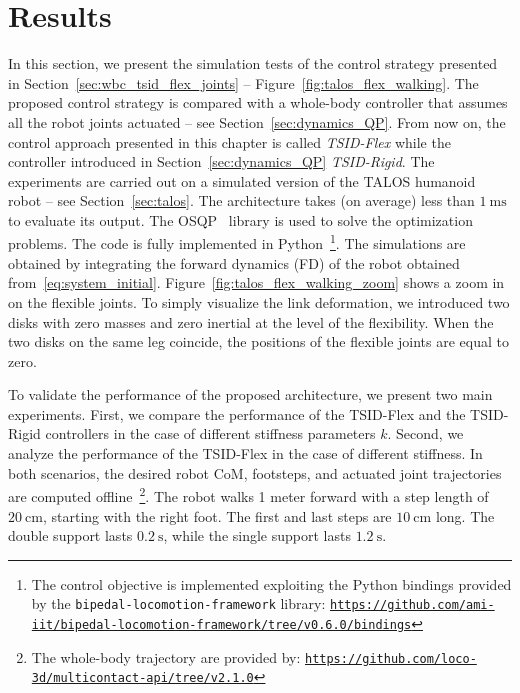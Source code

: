 \section{Results\label{sec:flexible_joint_result}}
In this section, we present the simulation tests of the control strategy presented in
Section~\ref{sec:wbc_tsid_flex_joints} -- Figure~\ref{fig:talos_flex_walking}.
The proposed control strategy is compared with a whole-body controller that assumes all the robot joints actuated --  see Section~\ref{sec:dynamics_QP}. From now on, the control approach presented in this chapter is called \emph{TSID-Flex} while the controller introduced in Section~\ref{sec:dynamics_QP} \emph{TSID-Rigid}.
The experiments are carried out on a simulated version of the TALOS humanoid robot -- see Section~\ref{sec:talos}. The architecture takes (on average) less than $\SI{1}{\milli \second}$ to evaluate its output. The OSQP~\citep{Stellato2018} library is used to solve the optimization problems. The code is fully implemented in Python~\footnote{The control objective is implemented exploiting the Python bindings provided by the \texttt{bipedal-locomotion-framework} library: \href{https://github.com/ami-iit/bipedal-locomotion-framework/tree/v0.6.0/bindings}{\texttt{https://github.com/ami-iit/bipedal-locomotion-framework/tree/v0.6.0/bindings}}}.
The simulations are obtained by integrating the forward dynamics (FD) of the robot obtained from~\eqref{eq:system_initial}. Figure~\ref{fig:talos_flex_walking_zoom} shows a zoom in on the flexible joints. To simply visualize the link deformation, we introduced two disks with zero masses and zero inertial at the level of the flexibility. When the two disks on the same leg coincide, the positions of the flexible joints are equal to zero.
\par
To validate the performance of the proposed architecture, we present two main experiments.
First, we compare the performance of the TSID-Flex and the TSID-Rigid controllers in the case of different stiffness parameters $k$. Second, we analyze the performance of the TSID-Flex in the case of different stiffness. In both scenarios, the desired robot CoM, footsteps, and actuated joint trajectories are computed offline~\footnote{The whole-body trajectory are provided by: \href{https://github.com/loco-3d/multicontact-api/tree/v2.1.0}{\texttt{https://github.com/loco-3d/multicontact-api/tree/v2.1.0}}}. The robot walks 1 meter forward with a step length of $\SI{20}{\centi\meter}$, starting with the right foot. The first and last steps are $\SI{10}{\centi \meter}$ long. The double support lasts $\SI{0.2}{\second}$, while the single support lasts $\SI{1.2}{\second}$.
